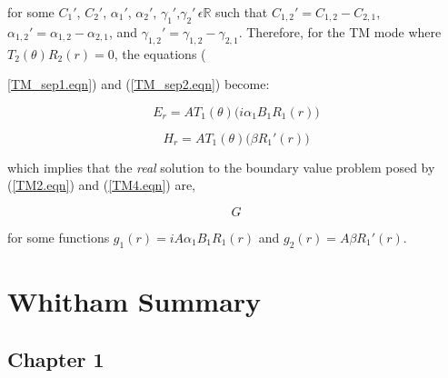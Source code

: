 \documentclass[12pt]{article}
\newtheorem{definition}{Definition}[section]
\theoremstyle{definition}
\numberwithin{equation}{section}
\begin{document}
for some $C_1 '$, $C_2 '$, $\alpha_1 '$, $\alpha_2 '$, $\gamma_1 '$,$\gamma_2 '\,\epsilon\mathbb{R}$ such that $C_{1,2}'=C_{1,2}-C_{2,1}$, $\alpha_{1,2}'=\alpha_{1,2}-\alpha_{2,1}$, and $\gamma_{1,2}'=\gamma_{1,2}-\gamma_{2,1}$. Therefore, for the TM mode where $T_2 (\theta)R_2 (r)=0$, the equations ({\ref{TM_sep1.eqn}) and (\ref{TM_sep2.eqn}) become:

\begin{equation}
E_r=AT_1 (\theta)\bigg(i\alpha_1 B_1 R_1 (r)\bigg)
\end{equation}

\begin{equation}
H_r=AT_1 (\theta)\bigg(\beta R_1 '(r)\bigg)
\end{equation}

which implies that the {\it real} solution to the boundary value problem posed by (\ref{TM2.eqn}) and (\ref{TM4.eqn}) are, 

\begin{equation}
G 
\end{equation}


for some functions $g_1 (r)=iA\alpha_1 B_1 R_1 (r)$ and $g_2(r)=A\beta R_1 '(r)$.







\section{Whitham Summary}

\subsection{Chapter 1}

}
\end{document}
